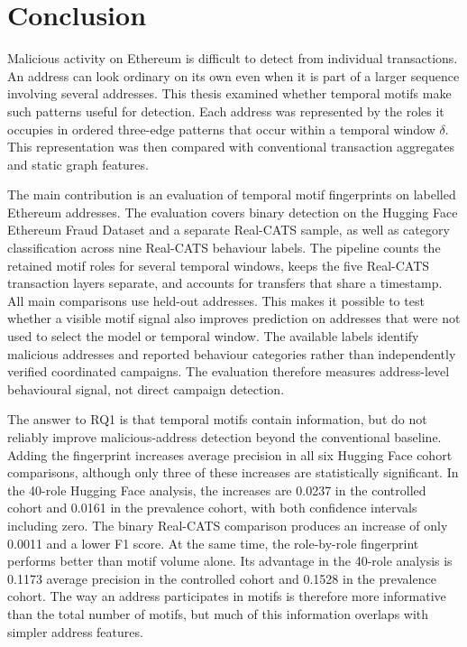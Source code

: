 \documentclass{thesisclass}
\begin{document}
\section{Conclusion}

Malicious activity on Ethereum is difficult to detect from individual
transactions. An address can look ordinary on its own even when it is part of a
larger sequence involving several addresses. This thesis examined whether
temporal motifs make such patterns useful for detection. Each address was
represented by the roles it occupies in ordered three-edge patterns that occur
within a temporal window $\delta$. This representation was then compared with
conventional transaction aggregates and static graph features.

The main contribution is an evaluation of temporal motif fingerprints
on labelled Ethereum addresses. The evaluation covers binary detection on the
Hugging Face Ethereum Fraud Dataset and a separate Real-CATS sample, as well as
category classification across nine Real-CATS behaviour labels. The pipeline
counts the retained motif roles for several temporal windows, keeps the five
Real-CATS transaction layers separate, and accounts for transfers that share a
timestamp. All main comparisons use held-out addresses. This makes it possible
to test whether a visible motif signal also improves prediction on addresses
that were not used to select the model or temporal window.
The available labels identify malicious addresses and reported behaviour
categories rather than independently verified coordinated campaigns. The
evaluation therefore measures address-level behavioural signal, not direct
campaign detection.

The answer to RQ1 is that temporal motifs contain information, but do not
reliably improve malicious-address detection beyond the conventional baseline.
Adding the fingerprint increases average precision in all six Hugging Face
cohort comparisons, although only three of these increases are statistically
significant. In the 40-role Hugging Face analysis, the increases are 0.0237 in
the controlled cohort and 0.0161 in the prevalence cohort, with both confidence
intervals including zero. The binary Real-CATS comparison produces an increase
of only 0.0011 and a lower F1 score. At the same time, the role-by-role
fingerprint performs better than motif volume alone. Its advantage in the
40-role analysis is 0.1173 average precision in the controlled cohort and
0.1528 in the prevalence cohort. The way an address participates in motifs is
therefore more informative than the total number of motifs, but much of this
information overlaps with simpler address features.
\end{document}

